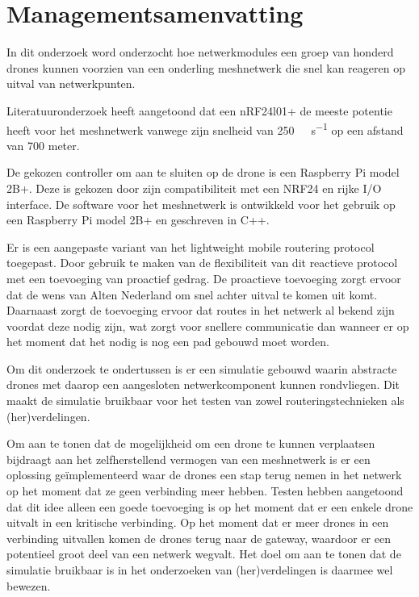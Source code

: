 \documentclass[a4paper, 11pt, oneside]{report}
\begin{document}
\chapter*{Managementsamenvatting}


In dit onderzoek word onderzocht hoe netwerkmodules een groep van honderd drones kunnen voorzien van een onderling meshnetwerk die snel kan reageren op uitval van netwerkpunten.

Literatuuronderzoek heeft aangetoond dat een nRF24l01+ de meeste potentie heeft voor het meshnetwerk vanwege zijn snelheid van \SI{250}{\kilo\bit\per\second} op een afstand van 700 meter.

De gekozen controller om aan te sluiten op de drone is een Raspberry Pi model 2B+. Deze is gekozen door zijn compatibiliteit met een NRF24 en rijke I/O interface. 
De software voor het meshnetwerk is ontwikkeld voor het gebruik op een Raspberry Pi model 2B+ en geschreven in C++.   

Er is een aangepaste variant van het lightweight mobile routering protocol toegepast. Door gebruik te maken van de flexibiliteit van dit reactieve protocol met een toevoeging van proactief gedrag. De proactieve toevoeging zorgt ervoor dat de wens van Alten Nederland om snel achter uitval te komen uit komt. Daarnaast zorgt de toevoeging ervoor dat routes in het netwerk al bekend zijn voordat deze nodig zijn, wat zorgt voor snellere communicatie dan wanneer er op het moment dat het nodig is nog een pad gebouwd moet worden.

Om dit onderzoek te ondertussen is er een simulatie gebouwd waarin abstracte drones met daarop een aangesloten netwerkcomponent kunnen rondvliegen. Dit maakt de simulatie bruikbaar voor het testen van zowel routeringstechnieken als (her)verdelingen. 

Om aan te tonen dat de mogelijkheid om een drone te kunnen verplaatsen bijdraagt aan het zelfherstellend vermogen van een meshnetwerk is er een oplossing geïmplementeerd waar de drones een stap terug nemen in het netwerk op het moment dat ze geen verbinding meer hebben.  Testen hebben aangetoond dat dit idee alleen een goede toevoeging is op het moment dat er een enkele drone uitvalt in een kritische verbinding. Op het moment dat er meer drones in een verbinding uitvallen komen de drones terug naar de gateway, waardoor er een potentieel groot deel van een netwerk wegvalt. Het doel om aan te tonen dat de simulatie bruikbaar is in het onderzoeken van (her)verdelingen is daarmee wel bewezen.
\end{document}
